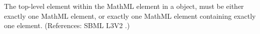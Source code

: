 The top-level element within the MathML  element in a
\FunctionDefinition object,  must be either exactly one MathML 
element, or exactly one MathML  element containing exactly
one  element.  (References: SBML L3V2
.)
